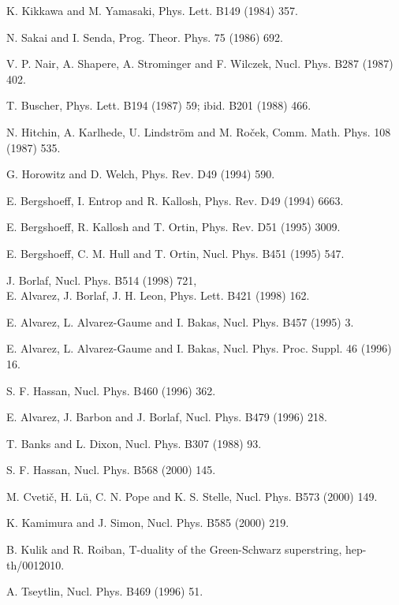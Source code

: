 \documentclass[a4paper,11pt]{article}
\begin{document}
\begin{thebibliography}{99}

K. Kikkawa and M. Yamasaki, Phys. Lett. B149 (1984) 357.

N. Sakai and I. Senda, Prog. Theor. Phys. 75 (1986) 692.

V. P. Nair, A. Shapere, A. Strominger and F. Wilczek, Nucl. Phys. B287 (1987) 
402.

T. Buscher, Phys. Lett. B194 (1987) 59; ibid. B201 (1988) 466.

N. Hitchin, A. Karlhede, U. Lindstr{\"o}m and M. Ro{\v{c}}ek, Comm. Math. Phys.
108 (1987) 535.

G. Horowitz and D. Welch, Phys. Rev. D49 (1994) 590.

E. Bergshoeff, I. Entrop and R. Kallosh, Phys. Rev. D49 (1994) 6663.

E. Bergshoeff, R. Kallosh and T. Ortin, Phys. Rev. D51 (1995) 3009.

E. Bergshoeff, C. M. Hull and T. Ortin, Nucl. Phys. B451 (1995) 547.

J. Borlaf, Nucl. Phys. B514 (1998) 721,\\
E. Alvarez, J. Borlaf, J. H. Leon, Phys. Lett. B421 (1998) 162.


E. Alvarez, L. Alvarez-Gaume and I. Bakas, Nucl. Phys. B457 (1995)
3.

E. Alvarez, L. Alvarez-Gaume and I. Bakas, Nucl. Phys. Proc. Suppl.
46 (1996) 16.

S. F. Hassan, Nucl. Phys. B460 (1996) 362.

E. Alvarez, J. Barbon and J. Borlaf, Nucl. Phys. B479 (1996)
218.

T. Banks and L. Dixon, Nucl. Phys. B307 (1988) 93.

S. F. Hassan, Nucl. Phys. B568 (2000) 145.

M. Cveti{\v{c}}, H. L{\"u}, C. N. Pope and K. S. Stelle, Nucl. Phys. B573
(2000) 149.

K. Kamimura and J. Simon, Nucl. Phys. B585 (2000) 219.

B. Kulik and R. Roiban, T-duality of the Green-Schwarz superstring,
hep-th/0012010.

A. Tseytlin, Nucl. Phys. B469 (1996) 51.




\end{thebibliography}
\end{document}
